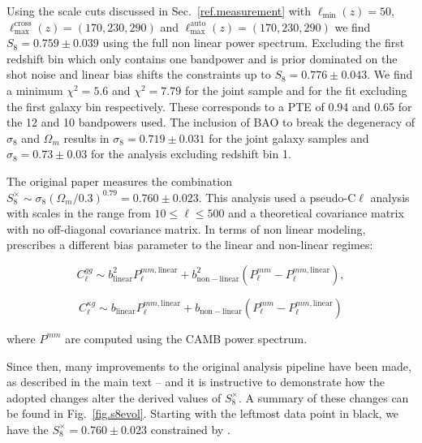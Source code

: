 \documentclass[twocolumn]{aastex631}
\begin{document}
{Using the scale cuts discussed in Sec.~\ref{ref.measurement} with $\ell_\mathrm{\min}(z)=50$, $\ell^{\mathrm{cross}}_\mathrm{\max}(z)=(170,230,290)$ and $\ell^{\mathrm{auto}}_\mathrm{\max}(z)=(170,230,290)$
we find $S_8=0.759\pm0.039$ using the full non linear power spectrum.  Excluding the first redshift bin which only contains one bandpower and is prior dominated on the shot noise and linear bias shifts the constraints up to $S_8=0.776\pm0.043$. We find a minimum $\chi^2=5.6$ and $\chi^2=7.79$ for the joint sample and for the fit excluding the first galaxy bin respectively. These corresponds to a PTE of 0.94 and 0.65 for the 12 and 10 bandpowers used. The inclusion of BAO to break the degeneracy of $\sigma_8$ and $\Omega_m$ results in $\sigma_8=0.719\pm0.031$ for the joint galaxy samples  and $\sigma_8=0.73\pm0.03$ for the analysis excluding redshift bin 1.



The original \cite{hang2021} paper measures the combination $S^{\times}_8\sim\sigma_8({\Omega_m/0.3})^{0.79}=0.760\pm0.023$. This analysis used a pseudo-C$\ell$ analysis with scales in the range from $10\leq\ell\leq500$ and a theoretical covariance matrix with no off-diagonal covariance matrix. In terms of non linear modeling, \citep{hang2021} prescribes a different bias parameter to the linear and non-linear regimes:

\begin{equation} C^{gg}_\ell{\sim}b^2_\mathrm{linear}P^{mm,\mathrm{linear}}_\ell+b^2_\mathrm{non-linear}(P^{mm}_\ell-P^{mm,\mathrm{linear}}_\ell),
\end{equation}

\begin{equation} C^{\kappa{g}}_\ell{\sim}b_\mathrm{linear}P^{mm,\mathrm{linear}}_\ell+b_\mathrm{non-linear}(P^{mm}_\ell-P^{mm,\mathrm{linear}}_\ell)
\end{equation}

where $P^{mm}$ are computed using the CAMB power spectrum.

Since then, many improvements to the original analysis pipeline have been made, as described in the main text -- and it is instructive to demonstrate how the adopted changes alter the derived values of  $S^{\times}_8$.  A summary of these changes can be found in Fig.~\ref{fig.s8evol}. Starting with the leftmost data point in black, we have the $S^\times_8=0.760\pm0.023$ constrained by \citep{hang2021}.

}
\end{document}
